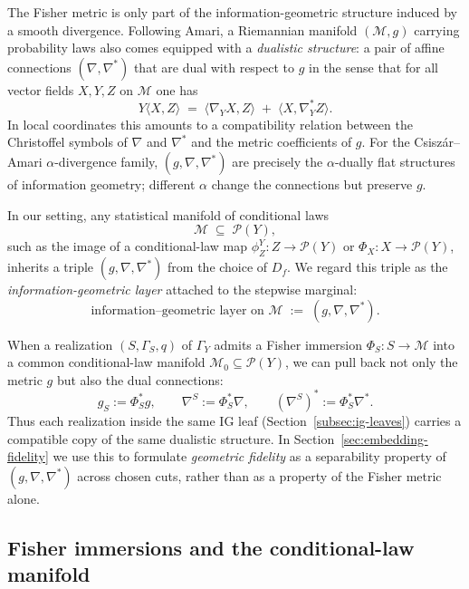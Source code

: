 \documentclass[11pt]{article}
\newcommand{\1}{\mathbf{1}}
\begin{document}
The Fisher metric is only part of the information-geometric structure induced by a smooth divergence. Following Amari, a Riemannian manifold $(\mathcal{M},g)$ carrying probability laws also comes equipped with a \emph{dualistic structure}: a pair of affine connections $(\nabla,\nabla^\ast)$ that are dual with respect to $g$ in the sense that for all vector fields $X,Y,Z$ on $\mathcal{M}$ one has
\begin{equation}
  Y\langle X,Z\rangle
  \;=\;
  \langle \nabla_Y X , Z \rangle
  \;+\;
  \langle X , \nabla^\ast_Y Z \rangle.
  \label{eq:dual-connections}
\end{equation}
In local coordinates this amounts to a compatibility relation between the Christoffel symbols of $\nabla$ and $\nabla^\ast$ and the metric coefficients of $g$. For the Csiszár--Amari $\alpha$-divergence family, $(g,\nabla,\nabla^\ast)$ are precisely the $\alpha$-dually flat structures of information geometry; different $\alpha$ change the connections but preserve $g$.

In our setting, any statistical manifold of conditional laws
\[
  \mathcal{M} \;\subseteq\; \mathcal{P}(Y),
\]
such as the image of a conditional-law map $\phi_Z^Y: Z\to\mathcal{P}(Y)$ or $\Phi_X : X\to\mathcal{P}(Y)$, inherits a triple $(g,\nabla,\nabla^\ast)$ from the choice of $D_f$. We regard this triple as the \emph{information-geometric layer} attached to the stepwise marginal:
\[
  \text{information--geometric layer on }\mathcal{M}
  \;:=\;
  (g,\nabla,\nabla^\ast).
\]

When a realization $(S,\Gamma_S,q)$ of $\Gamma_Y$ admits a Fisher immersion $\Phi_S : S\to\mathcal{M}$ into a common conditional-law manifold $\mathcal{M}_0\subseteq\mathcal{P}(Y)$, we can pull back not only the metric $g$ but also the dual connections:
\[
  g_S := \Phi_S^\ast g,
  \qquad
  \nabla^S := \Phi_S^\ast \nabla,
  \qquad
  (\nabla^S)^\ast := \Phi_S^\ast \nabla^\ast.
\]
Thus each realization inside the same IG leaf (Section~\ref{subsec:ig-leaves}) carries a compatible copy of the same dualistic structure. In Section~\ref{sec:embedding-fidelity} we use this to formulate \emph{geometric fidelity} as a separability property of $(g,\nabla,\nabla^\ast)$ across chosen cuts, rather than as a property of the Fisher metric alone.

\subsection{Fisher immersions and the conditional-law manifold}
\label{subsec:fisher-immersion-core}
\end{document}
